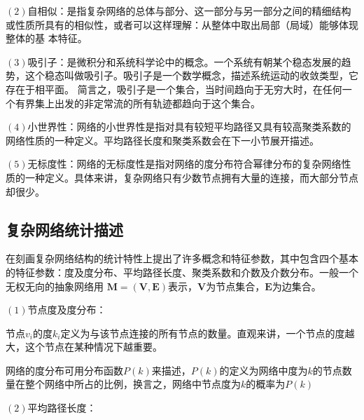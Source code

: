 $(2)$自相似：是指复杂网络的总体与部分、这一部分与另一部分之间的精细结构或性质所具有的相似性，或者可以这样理解：从整体中取出局部（局域）能够体现整体的基
本特征。

$(3)$吸引子：是微积分和系统科学论中的概念。一个系统有朝某个稳态发展的趋势，这个稳态叫做吸引子。吸引子是一个数学概念，描述系统运动的收敛类型，它存在于相平面。
简言之，吸引子是一个集合，当时间趋向于无穷大时，在任何一个有界集上出发的非定常流的所有轨迹都趋向于这个集合。

$(4)$小世界性：网络的小世界性是指对具有较短平均路径又具有较高聚类系数的网络性质的一种定义。平均路径长度和聚类系数会在下一小节展开描述。

$(5)$无标度性：网络的无标度性是指对网络的度分布符合幂律分布的复杂网络性质的一种定义。具体来讲，复杂网络只有少数节点拥有大量的连接，而大部分节点却很少。









\subsection{复杂网络统计描述}
\label{sec:feature}
在刻画复杂网络结构的统计特性上提出了许多概念和特征参数，其中包含四个基本的特征参数：度及度分布、平均路径长度、聚类系数和介数及介数分布。一般一个无权无向的抽象网络用
$\boldsymbol{M}=(\boldsymbol{V}, \boldsymbol{E})$表示，$\boldsymbol{V}$为节点集合，$\boldsymbol{E}$为边集合。

$(1)$节点度及度分布：

节点$v_i$的度$k_i$定义为与该节点连接的所有节点的数量。直观来讲，一个节点的度越大，这个节点在某种情况下越重要。

网络的度分布可用分布函数$P(k)$来描述，$P(k)$的定义为网络中度为$k$的节点数量在整个网络中所占的比例，换言之，网络中节点度为$k$的概率为$P(k)$

$(2)$平均路径长度：

